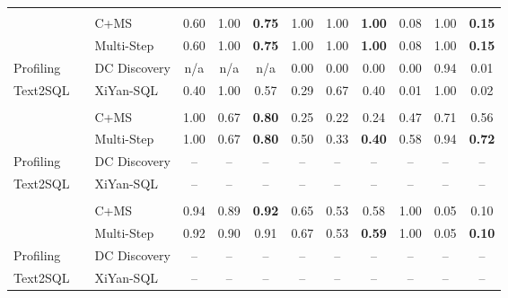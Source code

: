 \begin{tabular}{llccccccccc}
\midrule
\addlinespace[2pt]
\multicolumn{11}{c}{\textbf{Tax}} \\
\addlinespace[1pt]
\multirow{2}{*}{\system} & ~~C+MS & 0.60 & 1.00 & \textbf{0.75} & 1.00 & 1.00 & \textbf{1.00} & 0.08 & 1.00 & \textbf{0.15} \\
 & ~~Multi-Step & 0.60 & 1.00 & \textbf{0.75} & 1.00 & 1.00 & \textbf{1.00} & 0.08 & 1.00 & \textbf{0.15} \\
\cmidrule(l){2-11}
\multirow{1}{*}{Profiling} & ~~DC Discovery & n/a & n/a & n/a & 0.00 & 0.00 & 0.00 & 0.00 & 0.94 & 0.01 \\
\cmidrule(l){2-11}
\multirow{1}{*}{Text2SQL} & ~~XiYan-SQL & 0.40 & 1.00 & 0.57 & 0.29 & 0.67 & 0.40 & 0.01 & 1.00 & 0.02 \\
\midrule
\addlinespace[2pt]
\multicolumn{11}{c}{\textbf{HMDAZ}} \\
\addlinespace[1pt]
\multirow{2}{*}{\system} & ~~C+MS & 1.00 & 0.67 & \textbf{0.80} & 0.25 & 0.22 & 0.24 & 0.47 & 0.71 & 0.56 \\
 & ~~Multi-Step & 1.00 & 0.67 & \textbf{0.80} & 0.50 & 0.33 & \textbf{0.40} & 0.58 & 0.94 & \textbf{0.72} \\
\cmidrule(l){2-11}
\multirow{1}{*}{Profiling} & ~~DC Discovery & -- & -- & -- & -- & -- & -- & -- & -- & -- \\
\cmidrule(l){2-11}
\multirow{1}{*}{Text2SQL} & ~~XiYan-SQL & -- & -- & -- & -- & -- & -- & -- & -- & -- \\
\midrule
\addlinespace[2pt]
\multicolumn{11}{c}{\textbf{HMDA Checks}} \\
\addlinespace[1pt]
\multirow{2}{*}{\system} & ~~C+MS & 0.94 & 0.89 & \textbf{0.92} & 0.65 & 0.53 & 0.58 & 1.00 & 0.05 & 0.10 \\
 & ~~Multi-Step & 0.92 & 0.90 & 0.91 & 0.67 & 0.53 & \textbf{0.59} & 1.00 & 0.05 & \textbf{0.10} \\
\cmidrule(l){2-11}
\multirow{1}{*}{Profiling} & ~~DC Discovery & -- & -- & -- & -- & -- & -- & -- & -- & -- \\
\cmidrule(l){2-11}
\multirow{1}{*}{Text2SQL} & ~~XiYan-SQL & -- & -- & -- & -- & -- & -- & -- & -- & -- \\
\bottomrule
\end{tabular}

